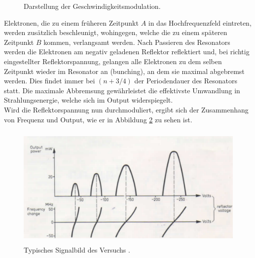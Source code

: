 \begin{figure}
  \centering
  \caption{Darstellung der Geschwindigkeitsmodulation.}
  \label{fig:mod}
\end{figure}

Elektronen, die zu einem früheren Zeitpunkt $A$ in das Hochfrequenzfeld eintreten, werden zusätzlich beschleunigt, wohingegen, welche die zu einem späteren Zeitpunkt $B$ kommen, verlangsamt werden.
Nach Passieren des Resonators werden die Elektronen am negativ geladenen Reflektor reflektiert und, bei richtig eingestellter Reflektorspannung, gelangen alle Elektronen zu dem selben Zeitpunkt wieder im Resonator an (bunching), an dem sie maximal abgebremst werden.
Dies findet immer bei $(n+3/4)$ der Periodendauer des Resonators statt.
Die maximale Abbremsung gewährleistet die effektivste Umwandlung in Strahlungsenergie, welche sich im Output widerspiegelt.\\
Wird die Reflektorspannung nun durchmoduliert, ergibt sich der Zusammenhang von Frequenz und Output, wie er in Abbildung \ref{fig:output} zu sehen ist.

\begin{figure}
  \centering
  \includegraphics[height=6cm]{ressources/output.png}
  \caption{Typisches Signalbild des Versuchs \cite{skript}.}
  \label{fig:output}
\end{figure}

